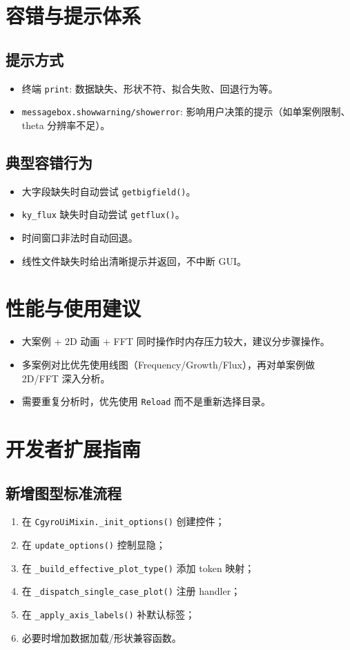 \documentclass[11pt,a4paper]{ctexart}
\begin{document}
\section{容错与提示体系}
\subsection{提示方式}
\begin{itemize}
  \item 终端 \texttt{print}: 数据缺失、形状不符、拟合失败、回退行为等。
  \item \texttt{messagebox.showwarning/showerror}: 影响用户决策的提示（如单案例限制、theta 分辨率不足）。
\end{itemize}

\subsection{典型容错行为}
\begin{itemize}
  \item 大字段缺失时自动尝试 \texttt{getbigfield()}。
  \item \texttt{ky\_flux} 缺失时自动尝试 \texttt{getflux()}。
  \item 时间窗口非法时自动回退。
  \item 线性文件缺失时给出清晰提示并返回，不中断 GUI。
\end{itemize}

\section{性能与使用建议}
\begin{itemize}
  \item 大案例 + 2D 动画 + FFT 同时操作时内存压力较大，建议分步骤操作。
  \item 多案例对比优先使用线图（Frequency/Growth/Flux），再对单案例做 2D/FFT 深入分析。
  \item 需要重复分析时，优先使用 \texttt{Reload} 而不是重新选择目录。
\end{itemize}

\section{开发者扩展指南}
\subsection{新增图型标准流程}
\begin{enumerate}
  \item 在 \texttt{CgyroUiMixin.\_init\_options()} 创建控件；
  \item 在 \texttt{update\_options()} 控制显隐；
  \item 在 \texttt{\_build\_effective\_plot\_type()} 添加 token 映射；
  \item 在 \texttt{\_dispatch\_single\_case\_plot()} 注册 handler；
  \item 在 \texttt{\_apply\_axis\_labels()} 补默认标签；
  \item 必要时增加数据加载/形状兼容函数。
\end{enumerate}
\end{document}
